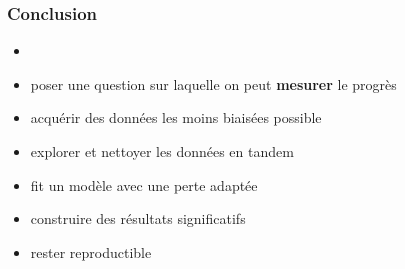 \documentclass{formation}
\begin{document}
\begin{frame}
  \frametitle{Conclusion}

  \begin{itemize}
  \item {}
  \item poser une question sur laquelle on peut \textbf{mesurer} le
    progrès
  \item acquérir des données les moins biaisées possible
  \item explorer et nettoyer les données en tandem
  \item fit un modèle avec une perte adaptée
  \item construire des résultats significatifs
  \item rester reproductible
  \end{itemize}
\end{frame}
\end{document}

